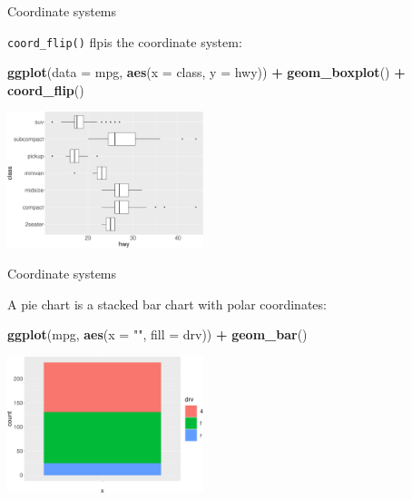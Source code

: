 \documentclass[ignorenonframetext,]{beamer}
\newenvironment{Shaded}{\begin{snugshade}}{\end{snugshade}}
\newcommand{\DataTypeTok}[1]{\textcolor[rgb]{0.13,0.29,0.53}{#1}}
\newcommand{\KeywordTok}[1]{\textcolor[rgb]{0.13,0.29,0.53}{\textbf{#1}}}
\newcommand{\NormalTok}[1]{#1}
\newcommand{\OperatorTok}[1]{\textcolor[rgb]{0.81,0.36,0.00}{\textbf{#1}}}
\newcommand{\StringTok}[1]{\textcolor[rgb]{0.31,0.60,0.02}{#1}}
\begin{document}
\begin{frame}[fragile]{Coordinate systems}
\protect\hypertarget{coordinate-systems}{}

\texttt{coord\_flip()} flpis the coordinate system:

\begin{Shaded}
\begin{Highlighting}[]
\KeywordTok{ggplot}\NormalTok{(}\DataTypeTok{data =}\NormalTok{ mpg, }\KeywordTok{aes}\NormalTok{(}\DataTypeTok{x =}\NormalTok{ class, }\DataTypeTok{y =}\NormalTok{ hwy)) }\OperatorTok{+}\StringTok{ }
\StringTok{  }\KeywordTok{geom_boxplot}\NormalTok{() }\OperatorTok{+}
\StringTok{  }\KeywordTok{coord_flip}\NormalTok{()}
\end{Highlighting}
\end{Shaded}

\begin{center}\includegraphics[height=150px]{data-visualization_files/figure-beamer/unnamed-chunk-141-1} \end{center}

\end{frame}

\begin{frame}[fragile]{Coordinate systems}
\protect\hypertarget{coordinate-systems-1}{}

A pie chart is a stacked bar chart with polar coordinates:

\begin{Shaded}
\begin{Highlighting}[]
\KeywordTok{ggplot}\NormalTok{(mpg, }\KeywordTok{aes}\NormalTok{(}\DataTypeTok{x =} \StringTok{""}\NormalTok{, }\DataTypeTok{fill =}\NormalTok{ drv)) }\OperatorTok{+}
\StringTok{  }\KeywordTok{geom_bar}\NormalTok{() }
\end{Highlighting}
\end{Shaded}

\begin{center}\includegraphics[height=150px]{data-visualization_files/figure-beamer/unnamed-chunk-142-1} \end{center}

\end{frame}
\end{document}
